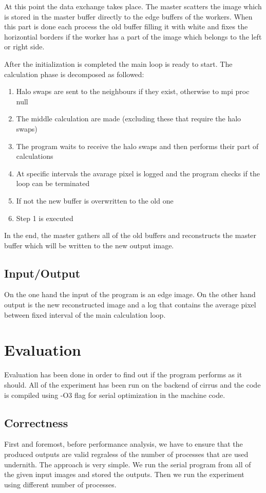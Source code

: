 \documentclass[12pt,a4paper]{article}
\newcommand{\sectionVspacing}{\vspace{15pt}}
\begin{document}
	At this point the data exchange takes place. The master scatters the image which is stored in the master buffer directly to the edge buffers of the workers. When this part is done each process the old buffer filling it with white and fixes the horizontial borders if the worker has a part of the image which belongs to the left or right side.

	After the initialization is completed the main loop is ready to start. The calculation phase is decomposed as followed:
	\begin{enumerate}
	  \item Halo swaps are sent to the neighbours if they exist, otherwise to mpi proc null
	  \item The middle calculation are made (excluding these that require the halo swaps)
	  \item The program waits to receive the halo swaps and then performs their part of calculations
	  \item At specific intervals the avarage pixel is logged and the program checks if the loop can be terminated
	  \item If not the new buffer is overwritten to the old one
	  \item Step 1 is executed
	\end{enumerate}

	In the end, the master gathers all of the old buffers and reconstructs the master buffer which will be written to the new output image.

	\subsection{Input/Output}
	On the one hand the input of the program is an edge image. On the other hand output is the new reconstructed image and a log that contains the average pixel between fixed interval of the main calculation loop.

\sectionVspacing

\section{Evaluation}
	Evaluation has been done in order to find out if the program performs as it should. All of the experiment has been run on the backend of cirrus and the code is compiled using -O3 flag for serial optimization in the machine code.


	\subsection{Correctness}
		First and foremost, before performance analysis, we have to ensure that the produced outputs are valid regraless of the number of processes that are used undernith. The approach is very simple. We run the serial program from all of the given input images and stored the outputs. Then we run the experiment using different number of processes.
\end{document}
